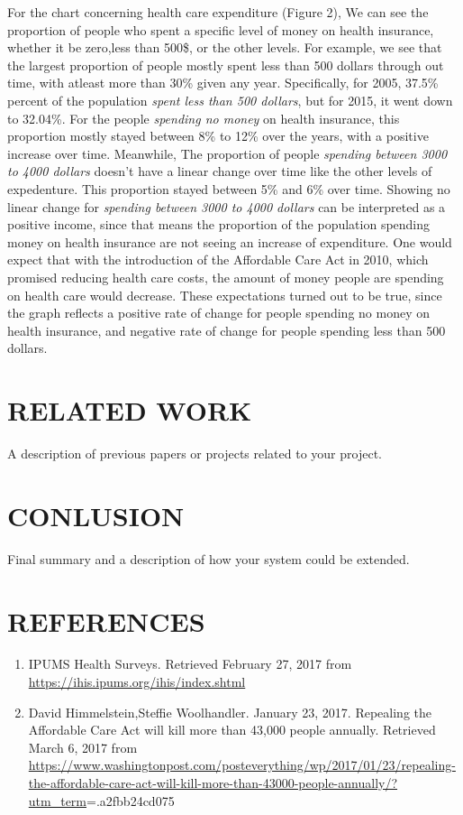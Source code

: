 \documentclass[10pt,]{article}
\begin{document}
For the chart concerning health care expenditure (Figure 2), We can see
the proportion of people who spent a specific level of money on health
insurance, whether it be zero,less than 500\$, or the other levels. For
example, we see that the largest proportion of people mostly spent less
than 500 dollars through out time, with atleast more than 30\% given any
year. Specifically, for 2005, 37.5\% percent of the population
\emph{spent less than 500 dollars}, but for 2015, it went down to
32.04\%. For the people \emph{spending no money} on health insurance,
this proportion mostly stayed between 8\% to 12\% over the years, with a
positive increase over time. Meanwhile, The proportion of people
\emph{spending between 3000 to 4000 dollars} doesn't have a linear
change over time like the other levels of expedenture. This proportion
stayed between 5\% and 6\% over time. Showing no linear change for
\emph{spending between 3000 to 4000 dollars} can be interpreted as a
positive income, since that means the proportion of the population
spending money on health insurance are not seeing an increase of
expenditure. One would expect that with the introduction of the
Affordable Care Act in 2010, which promised reducing health care costs,
the amount of money people are spending on health care would decrease.
These expectations turned out to be true, since the graph reflects a
positive rate of change for people spending no money on health
insurance, and negative rate of change for people spending less than 500
dollars.

\section{RELATED WORK}\label{related-work}

A description of previous papers or projects related to your project.

\section{CONLUSION}\label{conlusion}

Final summary and a description of how your system could be extended.

\section{REFERENCES}\label{references}

\begin{enumerate}
\def\labelenumi{\arabic{enumi}.}
\item
  IPUMS Health Surveys. Retrieved February 27, 2017 from
  \url{https://ihis.ipums.org/ihis/index.shtml}
\item
  David Himmelstein,Steffie Woolhandler. January 23, 2017. Repealing the
  Affordable Care Act will kill more than 43,000 people annually.
  Retrieved March 6, 2017 from
  \url{https://www.washingtonpost.com/posteverything/wp/2017/01/23/repealing-the-affordable-care-act-will-kill-more-than-43000-people-annually/?utm_term}=.a2fbb24cd075
\end{enumerate}
\newpage
\singlespacing 
\end{document}

